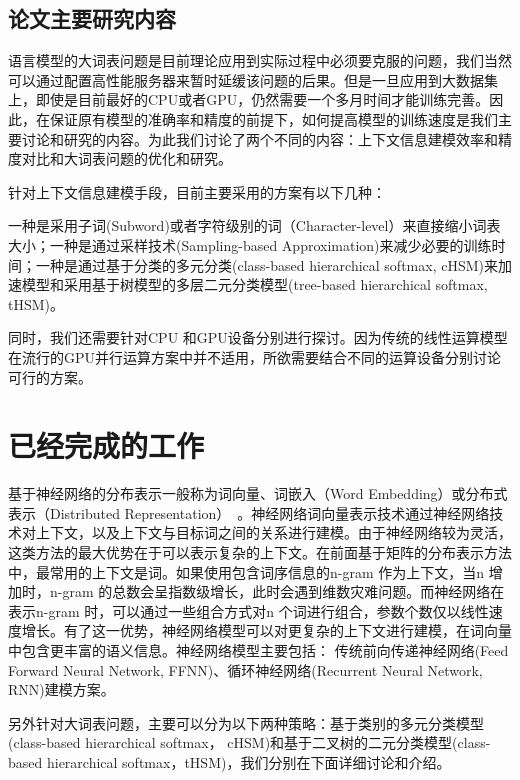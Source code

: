 \documentclass[twoside,UTF8,AutoFakeBold]{buaathesis}
\begin{document}
\subsection{论文主要研究内容}
语言模型的大词表问题是目前理论应用到实际过程中必须要克服的问题，我们当然可以通过配置高性能服务器来暂时延缓该问题的后果。但是一旦应用到大数据集上，即使是目前最好的CPU或者GPU，仍然需要一个多月时间才能训练完善。因此，在保证原有模型的准确率和精度的前提下，如何提高模型的训练速度是我们主要讨论和研究的内容。为此我们讨论了两个不同的内容：上下文信息建模效率和精度对比和大词表问题的优化和研究。

针对上下文信息建模手段，目前主要采用的方案有以下几种：

一种是采用子词(Subword)或者字符级别的词（Character-level）来直接缩小词表大小；一种是通过采样技术(Sampling-based Approximation)来减少必要的训练时间；一种是通过基于分类的多元分类(class-based hierarchical softmax, cHSM)来加速模型和采用基于树模型的多层二元分类模型(tree-based hierarchical softmax, tHSM)。

同时，我们还需要针对CPU 和GPU设备分别进行探讨。因为传统的线性运算模型在流行的GPU并行运算方案中并不适用，所欲需要结合不同的运算设备分别讨论可行的方案。



\section{已经完成的工作}
基于神经网络的分布表示一般称为词向量、词嵌入（Word Embedding）或分布式表示（Distributed Representation）~\cite{DBLP:conf/nips/MikolovSCCD13}。神经网络词向量表示技术通过神经网络技术对上下文，以及上下文与目标词之间的关系进行建模。由于神经网络较为灵活，这类方法的最大优势在于可以表示复杂的上下文。在前面基于矩阵的分布表示方法中，最常用的上下文是词。如果使用包含词序信息的n-gram 作为上下文，当n 增加时，n-gram 的总数会呈指数级增长，此时会遇到维数灾难问题。而神经网络在表示n-gram 时，可以通过一些组合方式对n 个词进行组合，参数个数仅以线性速度增长。有了这一优势，神经网络模型可以对更复杂的上下文进行建模，在词向量中包含更丰富的语义信息。神经网络模型主要包括： 传统前向传递神经网络(Feed Forward Neural Network, FFNN)、循环神经网络(Recurrent Neural Network, RNN)建模方案。

另外针对大词表问题，主要可以分为以下两种策略：基于类别的多元分类模型(class-based hierarchical softmax， cHSM)和基于二叉树的二元分类模型(class-based hierarchical softmax，tHSM)，我们分别在下面详细讨论和介绍。
\end{document}
